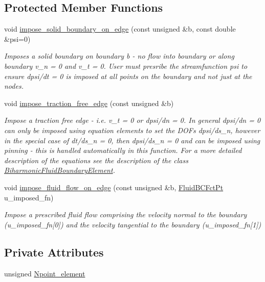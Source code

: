 \subsection*{Protected Member Functions}
\begin{DoxyCompactItemize}
\item 
void \hyperlink{classoomph_1_1BiharmonicFluidProblem_a1a00fff232d2438c83b66437d8e86aab}{impose\+\_\+solid\+\_\+boundary\+\_\+on\+\_\+edge} (const unsigned \&b, const double \&psi=0)
\begin{DoxyCompactList}\small\item\em Imposes a solid boundary on boundary b -\/ no flow into boundary or along boundary v\+\_\+n = 0 and v\+\_\+t = 0. User must presribe the streamfunction psi to ensure dpsi/dt = 0 is imposed at all points on the boundary and not just at the nodes. \end{DoxyCompactList}\item 
void \hyperlink{classoomph_1_1BiharmonicFluidProblem_a1cc57555bbd0ceef1d93010c133ac597}{impose\+\_\+traction\+\_\+free\+\_\+edge} (const unsigned \&b)
\begin{DoxyCompactList}\small\item\em Impose a traction free edge -\/ i.\+e. v\+\_\+t = 0 or dpsi/dn = 0. In general dpsi/dn = 0 can only be imposed using equation elements to set the D\+O\+Fs dpsi/ds\+\_\+n, however in the special case of dt/ds\+\_\+n = 0, then dpsi/ds\+\_\+n = 0 and can be imposed using pinning -\/ this is handled automatically in this function. For a more detailed description of the equations see the description of the class \hyperlink{classoomph_1_1BiharmonicFluidBoundaryElement}{Biharmonic\+Fluid\+Boundary\+Element}. \end{DoxyCompactList}\item 
void \hyperlink{classoomph_1_1BiharmonicFluidProblem_a1006320d9024555042645ed6347ff8fb}{impose\+\_\+fluid\+\_\+flow\+\_\+on\+\_\+edge} (const unsigned \&b, \hyperlink{classoomph_1_1BiharmonicFluidProblem_a93661d3b0c52bd82fd58496f9f853079}{Fluid\+B\+C\+Fct\+Pt} u\+\_\+imposed\+\_\+fn)
\begin{DoxyCompactList}\small\item\em Impose a prescribed fluid flow comprising the velocity normal to the boundary (u\+\_\+imposed\+\_\+fn\mbox{[}0\mbox{]}) and the velocity tangential to the boundary (u\+\_\+imposed\+\_\+fn\mbox{[}1\mbox{]}) \end{DoxyCompactList}\end{DoxyCompactItemize}
\subsection*{Private Attributes}
\begin{DoxyCompactItemize}
\item 
unsigned \hyperlink{classoomph_1_1BiharmonicFluidProblem_a2dd20deeccc884a3859577a0b7f636e9}{Npoint\+\_\+element}
\end{DoxyCompactItemize}
